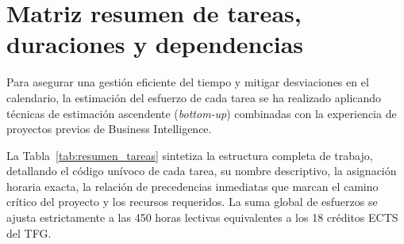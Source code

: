 \documentclass[12pt, a4paper, twoside]{report}
\begin{document}
\section{Matriz resumen de tareas, duraciones y dependencias}
Para asegurar una gestión eficiente del tiempo y mitigar desviaciones en el calendario, la estimación del esfuerzo de cada tarea se ha realizado aplicando técnicas de estimación ascendente (\textit{bottom-up}) combinadas con la experiencia de proyectos previos de Business Intelligence.

La Tabla~\ref{tab:resumen_tareas} sintetiza la estructura completa de trabajo, detallando el código unívoco de cada tarea, su nombre descriptivo, la asignación horaria exacta, la relación de precedencias inmediatas que marcan el camino crítico del proyecto y los recursos requeridos. La suma global de esfuerzos se ajusta estrictamente a las 450 horas lectivas equivalentes a los 18 créditos ECTS del TFG.
\end{document}
